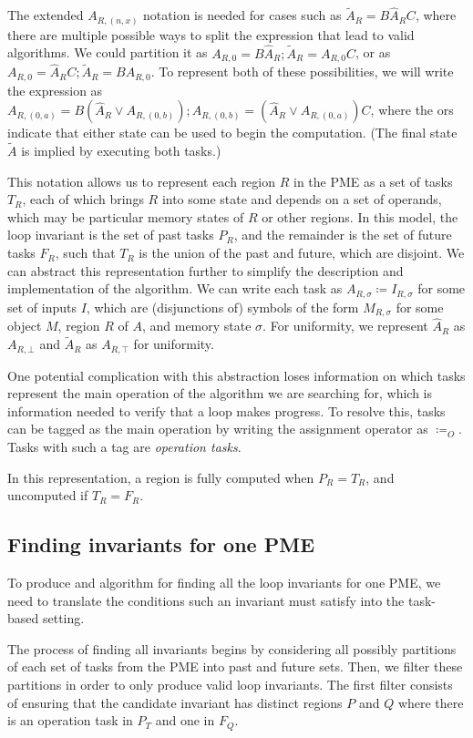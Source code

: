 \documentclass[12pt,letterpaper]{article}
\begin{document}
The extended $A_{R, (n, x)}$ notation is needed for cases such as $\widetilde{A}_R = B\hat{A}_RC$, where there are multiple possible ways to split the expression that lead to valid algorithms.
We could partition it as $A_{R, 0} = B\hat{A}_R; \widetilde{A}_R = A_{R, 0}C$, or as $A_{R, 0} = \hat{A}_RC; \widetilde{A}_R = BA_{R, 0}$.
To represent both of these possibilities, we will write the expression as $A_{R, (0, a)} = B(\hat{A}_R \vee A_{R, (0, b)}); A_{R, (0, b)} = (\hat{A}_R \vee A_{R, (0, a)})C$, where the ors indicate that either state can be used to begin the computation.
(The final state $\widetilde{A}$ is implied by executing both tasks.)

This notation allows us to represent each region $R$ in the PME as a set of tasks $T_R$, each of which brings $R$ into some state and depends on a set of operands, which may be particular memory states of $R$ or other regions.
In this model, the loop invariant is the set of past tasks $P_{R}$, and the remainder is the set of future tasks $F_{R}$, such that $T_R$ is the union of the past and future, which are disjoint.
We can abstract this representation further to simplify the description and implementation of the algorithm.
We can write each task as $A_{R, \sigma} \coloneqq I_{R, \sigma}$ for some set of inputs $I$, which are (disjunctions of) symbols of the form $M_{R, \sigma}$ for some object $M$, region $R$ of $A$, and memory state $\sigma$.
For uniformity, we represent $\hat{A}_R$ as $A_{R, \bot}$ and $\widetilde{A}_R$ as $A_{R, \top}$ for uniformity.

One potential complication with this abstraction loses information on which tasks represent the main operation of the algorithm we are searching for, which is information needed to verify that a loop makes progress.
To resolve this, tasks can be tagged as the main operation by writing the assignment operator as $\coloneqq_O$.
Tasks with such a tag are \emph{operation tasks}.

In this representation, a region is fully computed when $P_R = T_R$, and uncomputed if $T_R = F_R$.

\subsection{Finding invariants for one PME}
To produce and algorithm for finding all the loop invariants for one PME, we need to translate the conditions such an invariant must satisfy into the task-based setting.

The process of finding all invariants begins by considering all possibly partitions of each set of tasks from the PME into past and future sets.
Then, we filter these partitions in order to only produce valid loop invariants.
The first filter consists of ensuring that the candidate invariant has distinct regions $P$ and $Q$ where there is an operation task in $P_T$ and one in $F_Q$.
\end{document}
